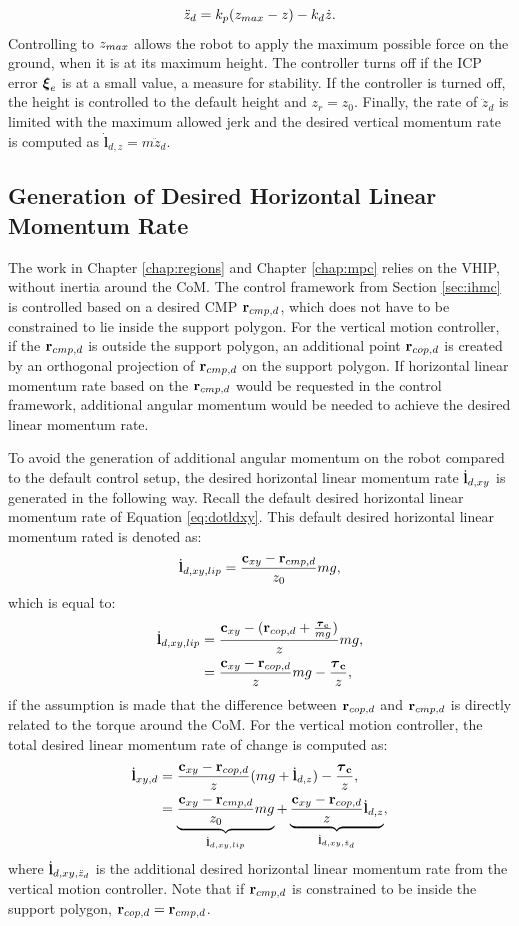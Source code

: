\begin{equation}
	\ddot{z}_d = k_p(z_{max}-z)-k_d\dot{z}.
\end{equation}
Controlling to $z_{max}$ allows the robot to apply the maximum possible force on the ground, when it is at its maximum height. The controller turns off if the \ac{ICP} error $\boldsymbol{\xi}_e$ is at a small value, a measure for stability. If the controller is turned off, the height is controlled to the default height and $z_r=z_0$. Finally, the rate of $\ddot{z}_d$ is limited with the maximum allowed jerk and the desired vertical momentum rate is computed as $\dot{\mathbf{l}}_{d,z}=m\ddot{z}_d$.

\subsection{Generation of Desired Horizontal Linear Momentum Rate}
The work in Chapter \ref{chap:regions} and Chapter \ref{chap:mpc} relies on the \ac{VHIP}, without inertia around the \ac{CoM}. The control framework from Section \ref{sec:ihmc} is controlled based on a desired \ac{CMP} $\mathbf{r}_{cmp,d}$, which does not have to be constrained to lie inside the support polygon. For the vertical motion controller, if the $\mathbf{r}_{cmp,d}$ is outside the support polygon, an additional point $\mathbf{r}_{cop,d}$ is created by an orthogonal projection of $\mathbf{r}_{cmp,d}$ on the support polygon. If horizontal linear momentum rate based on the $\mathbf{r}_{cmp,d}$ would be requested in the control framework, additional angular momentum would be needed to achieve the desired linear momentum rate.  

To avoid the generation of additional angular momentum on the robot compared to the default control setup, the desired horizontal linear momentum rate $\dot{\mathbf{l}}_{d,xy}$ is generated in the following way. Recall the default desired horizontal linear momentum rate of Equation \ref{eq:dotldxy}. This default desired horizontal linear momentum rated is denoted as:
\begin{equation}
    \dot{\mathbf{l}}_{d,xy,lip} = \frac{\mathbf{c}_{xy}-\mathbf{r}_{cmp,d}}{z_0}mg,
\end{equation}
which is equal to:
\begin{align}
\dot{\mathbf{l}}_{d,xy,lip}&=\frac{\mathbf{c}_{xy}-(\mathbf{r}_{cop,d}+\frac{\boldsymbol{\tau}_{\mathbf{c}}}{mg})}{z}mg, \\
&=\frac{\mathbf{c}_{xy}-\mathbf{r}_{cop,d}}{z}mg - \frac{\boldsymbol{\tau}_{\mathbf{c}}}{z},
\end{align}
if the assumption is made that the difference between $\mathbf{r}_{cop,d}$ and $\mathbf{r}_{cmp,d}$ is directly related to the torque around the \ac{CoM}. For the vertical motion controller, the total desired linear momentum rate of change is computed as:
 \begin{align}
\dot{\mathbf{l}}_{xy,d}&=\frac{\mathbf{c}_{xy}-\mathbf{r}_{cop,d}}{z}(mg+\dot{\mathbf{l}}_{d,z}) - \frac{\boldsymbol{\tau}_{\mathbf{c}}}{z},\\
&=\underbrace{ \frac{\mathbf{c}_{xy}-\mathbf{r}_{cmp,d}} {z_0}mg}_{\dot{\mathbf{l}}_{d,xy,lip}}  + \underbrace{\frac{\mathbf{c}_{xy}-\mathbf{r}_{cop,d}}{z}\dot{\mathbf{l}}_{d,z}}_{\dot{\mathbf{l}}_{d,xy,\ddot{z}_d}},
\end{align}
where $\dot{\mathbf{l}}_{d,xy,\ddot{z}_d}$ is the additional desired horizontal linear momentum rate from the vertical motion controller. Note that if $\mathbf{r}_{cmp,d}$ is constrained to be inside the support polygon, $\mathbf{r}_{cop,d}=\mathbf{r}_{cmp,d}$. 

